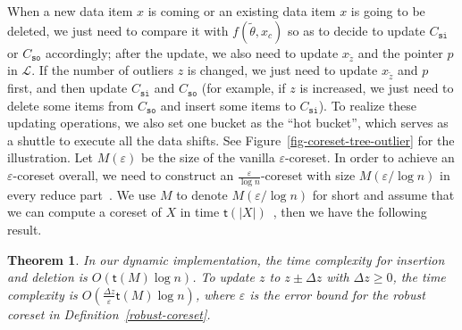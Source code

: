 \documentclass{article}
\newtheorem{theorem}{Theorem}
\begin{document}
When a new data item $x$ is coming or an existing data item $x$ is going to be deleted, we just need to compare it with $ f(\tilde{\theta},x_c) $ so as to decide to update $C_{\mathtt{si}}$ or $C_{\mathtt{so}}$ accordingly; after the update, we also need to update $ x_{\tilde{z}} $ and the pointer $p$ in $\mathscr{L}$. If the number of outliers $z$ is changed, we just need to update $ x_{\tilde{z}} $ and  $p$ first, and then update $C_{\mathtt{si}}$ and $C_{\mathtt{so}}$ (for example, if $z$ is increased, we just need to delete some items from $C_{\mathtt{so}}$ and insert some items to $C_{\mathtt{si}}$). To realize these updating operations, we also set one bucket as the ``hot bucket'', which serves as a shuttle to execute all the data shifts. See Figure~\ref{fig-coreset-tree-outlier} for the illustration. Let $ M(\varepsilon) $ be the size of the vanilla $\varepsilon$-coreset. In order to achieve an $ \varepsilon $-coreset overall, we need to construct an $ \frac{\varepsilon}{\log n} $-coreset with size $ M(\varepsilon/\log n) $ in every reduce part~\cite{AgarwalHV04}. We use $ M $ to denote $ M(\varepsilon/\log n) $ for short and assume that we can compute a coreset of $ X $ in time $ \mathsf{t}(|X|) $~\cite{DBLP:books/daglib/0035668}, then we have the following result.
\begin{theorem}
\label{the-dynamic}
In our dynamic implementation, the time complexity for insertion and deletion is $O(\mathsf{t}(M)\log n)$. To update $z$ to $z\pm \Delta z$ with $\Delta z\geq 0$, the time complexity is $O(\frac{\Delta z}{\varepsilon}\mathsf{t}(M)\log n)$, where $\varepsilon$ is the error bound for the robust coreset in Definition~\ref{robust-coreset}. 
\end{theorem}

\end{document}

